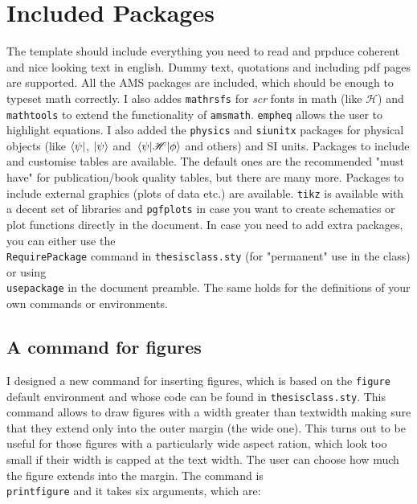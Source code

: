 \section{Included Packages}

The template should include everything you need to read and prpduce coherent and nice looking text in english. Dummy text, quotations and including pdf pages are supported. All the AMS packages are included, which should be enough to typeset math correctly. I also addes \texttt{mathrsfs} for \textit{scr} fonts in math (like $\mathscr{H}$) and \texttt{mathtools} to extend the functionality of \texttt{amsmath}. \texttt{empheq} allows the user to highlight equations. I also added the \texttt{physics} and \texttt{siunitx} packages for physical objects (like $\bra{\psi}$, $\ket{\psi}$ and $\mel{\psi}{\mathscr{H}}{\phi}$ and others) and SI units. Packages to include and customise tables are available. The default ones are the recommended "must have" for publication/book quality tables, but there are many more. Packages to include external graphics (plots of data etc.) are available. \texttt{tikz} is available with a decent set of libraries and \texttt{pgfplots} in case you want to create schematics or plot functions directly in the document. In case you need to add extra packages, you can either use the \texttt{\\RequirePackage} command in \texttt{thesisclass.sty} (for "permanent" use in the class) or using \texttt{\\usepackage} in the document preamble. The same holds for the definitions of your own commands or environments. 

\subsection{A command for figures}

I designed a new command for inserting figures, which is based on the \texttt{figure} default environment and whose code can be found in \texttt{thesisclass.sty}. This command allows to draw figures with a width greater than textwidth making sure that they extend only into the outer margin (the wide one). This turns out to be useful for those figures with a particularly wide aspect ration, which look too small if their width is capped at the text width. The user can choose how much the figure extends into the margin. The command is \texttt{\\printfigure} and it takes six arguments, which are:


